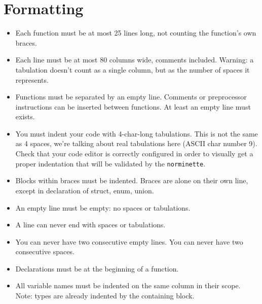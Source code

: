 \documentclass{42-en}
\begin{document}
    \section{Formatting}

            \begin{itemize}

            \item Each function must be at most 25 lines long, not
              counting the function's own braces.

            \item Each line must be at most 80 columns wide, comments
              included. Warning: a tabulation doesn't count
              as a single column, but as the number of spaces it
              represents.

            \item Functions must be separated by an empty line. Comments or preprocessor instructions
              can be inserted between functions. At least an empty line must exists.

            \item You must indent your code with 4-char-long tabulations.
              This is not the same as 4 spaces, we're talking about real tabulations here (ASCII char number 9).
              Check that your code editor is correctly configured in order to visually get a proper indentation
              that will be validated by the \texttt{norminette}.

            \item Blocks within braces must be indented. Braces are alone on their own line,
              except in declaration of struct, enum, union.

            \item An empty line must be empty: no spaces or tabulations.

            \item A line can never end with spaces or tabulations.
              
            \item You can never have two consecutive empty lines.
              You can never have two consecutive spaces.

            \item Declarations must be at the beginning of a function.

            \item All variable names must be indented on the same
              column in their scope. Note: types are already indented by the containing block.


\end{itemize}
\end{document}
